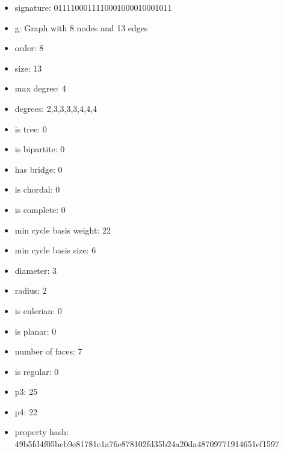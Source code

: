 \begin{itemize}
\item signature: 0111100011110001000010001011
\item g: Graph with 8 nodes and 13 edges
\item order: 8
\item size: 13
\item max degree: 4
\item degrees: 2,3,3,3,3,4,4,4
\item is tree: 0
\item is bipartite: 0
\item has bridge: 0
\item is chordal: 0
\item is complete: 0
\item min cycle basis weight: 22
\item min cycle basis size: 6
\item diameter: 3
\item radius: 2
\item is eulerian: 0
\item is planar: 0
\item number of faces: 7
\item is regular: 0
\item p3: 25
\item p4: 22
\item property hash: 49b5fd4f05bcb9e81781e1a76e878102fd35b24a20da48709771914651ef1597
\end{itemize}
\newpage
\begin{figure}
\end{figure}
